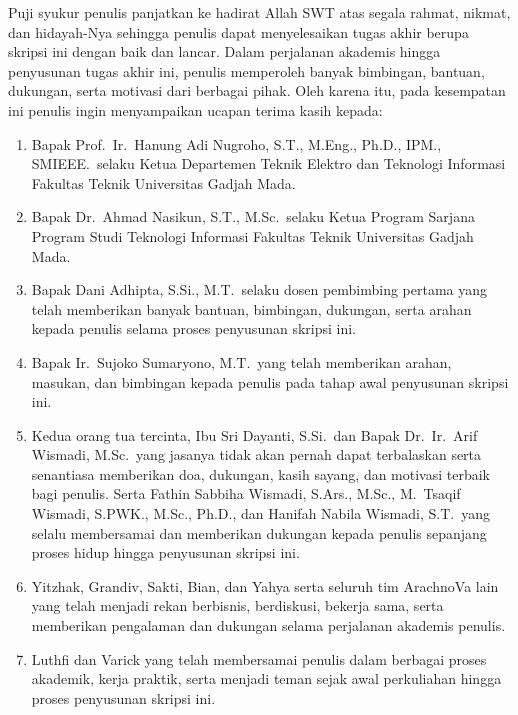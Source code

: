 Puji syukur penulis panjatkan ke hadirat Allah SWT atas segala rahmat,
nikmat, dan hidayah-Nya sehingga penulis dapat menyelesaikan tugas akhir
berupa skripsi ini dengan baik dan lancar. Dalam perjalanan akademis
hingga penyusunan tugas akhir ini, penulis memperoleh banyak bimbingan,
bantuan, dukungan, serta motivasi dari berbagai pihak. Oleh karena itu,
pada kesempatan ini penulis ingin menyampaikan ucapan terima kasih kepada:

\begin{enumerate}

  \item Bapak Prof.\ Ir.\ Hanung Adi Nugroho, S.T., M.Eng., Ph.D., IPM.,
        SMIEEE.\ selaku Ketua Departemen Teknik Elektro dan Teknologi
        Informasi Fakultas Teknik Universitas Gadjah Mada.

  \item Bapak Dr.\ Ahmad Nasikun, S.T., M.Sc.\ selaku Ketua Program Sarjana
        Program Studi Teknologi Informasi Fakultas Teknik Universitas Gadjah
        Mada.

  \item Bapak Dani Adhipta, S.Si., M.T.\ selaku dosen pembimbing pertama
        yang telah memberikan banyak bantuan, bimbingan, dukungan, serta
        arahan kepada penulis selama proses penyusunan skripsi ini.

  \item Bapak Ir.\ Sujoko Sumaryono, M.T.\ yang telah memberikan arahan,
        masukan, dan bimbingan kepada penulis pada tahap awal penyusunan
        skripsi ini.

  \item Kedua orang tua tercinta, Ibu Sri Dayanti, S.Si.\ dan Bapak Dr.\
        Ir.\ Arif Wismadi, M.Sc.\ yang jasanya tidak akan pernah dapat
        terbalaskan serta senantiasa memberikan doa, dukungan, kasih sayang,
        dan motivasi terbaik bagi penulis. Serta Fathin Sabbiha Wismadi, S.Ars., M.Sc., M.\ Tsaqif Wismadi, S.PWK., M.Sc., Ph.D.,
        dan Hanifah Nabila Wismadi, S.T.\ yang selalu membersamai dan
        memberikan dukungan kepada penulis sepanjang proses hidup hingga
        penyusunan skripsi ini.

  \item Yitzhak, Grandiv, Sakti, Bian, dan Yahya serta seluruh tim
        ArachnoVa lain yang telah menjadi rekan berbisnis, berdiskusi,
        bekerja sama, serta memberikan pengalaman dan dukungan selama
        perjalanan akademis penulis.

  \item Luthfi dan Varick yang telah membersamai penulis dalam berbagai
        proses akademik, kerja praktik, serta menjadi teman sejak awal
        perkuliahan hingga proses penyusunan skripsi ini.


\end{enumerate}
